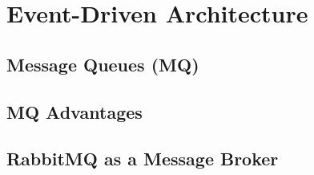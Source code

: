 

\pagebreak

\section{Event-Driven Architecture}
\subsection{Message Queues (MQ)}
\subsection{MQ Advantages}
\subsection{RabbitMQ as a Message Broker}